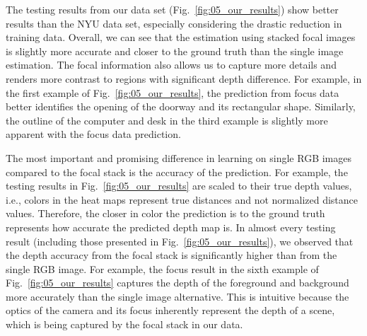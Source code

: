 \documentclass[letterpaper, 10 pt, conference]{ieeeconf}  %
\begin{document}
The testing results from our data set (Fig.~\ref{fig:05_our_results}) show better results than the NYU data set, especially considering the drastic reduction in training data. Overall, we can see that the estimation using stacked focal images is slightly more accurate and closer to the ground truth than the single image estimation. The focal information also allows us to capture more details and renders more contrast to regions with significant depth difference. For example, in the first example of Fig.~\ref{fig:05_our_results}, the prediction from focus data better identifies the opening of the doorway and its rectangular shape. Similarly, the outline of the computer and desk in the third example is slightly more apparent with the focus data prediction. 

The most important and promising difference in learning on single RGB images compared to the focal stack is the accuracy of the prediction. For example, the testing results in Fig.~\ref{fig:05_our_results} are scaled to their true depth values, i.e., colors in the heat maps represent true distances and not normalized distance values. Therefore, the closer in color the prediction is to the ground truth represents how accurate the predicted depth map is. In almost every testing result (including those presented in Fig.~\ref{fig:05_our_results}), we observed that the depth accuracy from the focal stack is significantly higher than from the single RGB image. For example, the focus result in the sixth example of Fig.~\ref{fig:05_our_results} captures the depth of the foreground and background more accurately than the single image alternative. This is intuitive because the optics of the camera and its focus inherently represent the depth of a scene, which is being captured by the focal stack in our data. 
\end{document}
